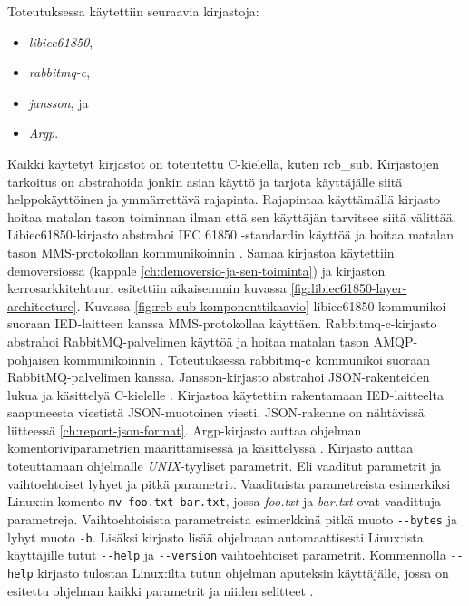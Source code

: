 Toteutuksessa käytettiin seuraavia kirjastoja:
\begin{itemize}
	\item \emph{libiec61850},
	\item \emph{rabbitmq-c},
	\item \emph{jansson}, ja
	\item \emph{Argp}.
\end{itemize}
Kaikki käytetyt kirjastot on toteutettu C-kielellä, kuten rcb\_sub. Kirjastojen tarkoitus on abstrahoida jonkin asian käyttö ja tarjota käyttäjälle siitä helppokäyttöinen ja ymmärrettävä rajapinta. Rajapintaa käyttämällä kirjasto hoitaa matalan tason toiminnan ilman että sen käyttäjän tarvitsee siitä välittää. Libiec61850-kirjasto abstrahoi IEC 61850 -standardin käyttöä ja hoitaa matalan tason MMS-protokollan kommunikoinnin \mbox{\cite{libIEC61850-repo}}. Samaa kirjastoa käytettiin demoversiossa (kappale \ref{ch:demoversio-ja-sen-toiminta}) ja kirjaston kerrosarkkitehtuuri esitettiin aikaisemmin kuvassa \ref{fig:libiec61850-layer-architecture}. Kuvassa \ref{fig:rcb-sub-komponenttikaavio} libiec61850 kommunikoi suoraan IED-laitteen kanssa MMS-protokollaa käyttäen. Rabbitmq-c-kirjasto abstrahoi RabbitMQ-palvelimen käyttöä ja hoitaa matalan tason AMQP-pohjaisen kommunikoinnin \mbox{\cite{rabbitmq-c-repo}}. Toteutuksessa rabbitmq-c kommunikoi suoraan RabbitMQ-palvelimen kanssa. Jansson-kirjasto abstrahoi JSON-rakenteiden lukua ja käsittelyä C-kielelle \mbox{\cite{jansson-repo}}. Kirjastoa käytettiin rakentamaan IED-\-lait\-teel\-ta saapuneesta viestistä JSON-muotoinen viesti. JSON-rakenne on nähtävissä liitteessä \ref{ch:report-json-format}. Argp-kirjasto auttaa ohjelman komentoriviparametrien määrittämisessä ja käsittelyssä \mbox{\cite{argp-glibc-guide}}. Kirjasto auttaa toteuttamaan ohjelmalle \emph{UNIX}-tyyliset parametrit. Eli vaaditut parametrit ja vaihtoehtoiset lyhyet ja pitkä parametrit. Vaadituista parametreista esimerkiksi Linux:in komento \texttt{mv foo.txt bar.txt}, jossa \emph{foo.txt} ja \emph{bar.txt} ovat vaadittuja parametreja. Vaihtoehtoisista parametreista esimerkkinä pitkä muoto \texttt{-{}-bytes} ja lyhyt muoto \texttt{-b}. Lisäksi kirjasto lisää ohjelmaan automaattisesti Linux:ista käyttäjille tutut \texttt{-{}-help} ja \texttt{-{}-version} vaihtoehtoiset parametrit. Kommennolla \texttt{-{}-help} kirjasto tulostaa Linux:ilta tutun ohjelman aputeksin käyttäjälle, jossa on esitettu ohjelman kaikki parametrit ja niiden selitteet \mbox{\cite{step-by-step-into-argp}}.

